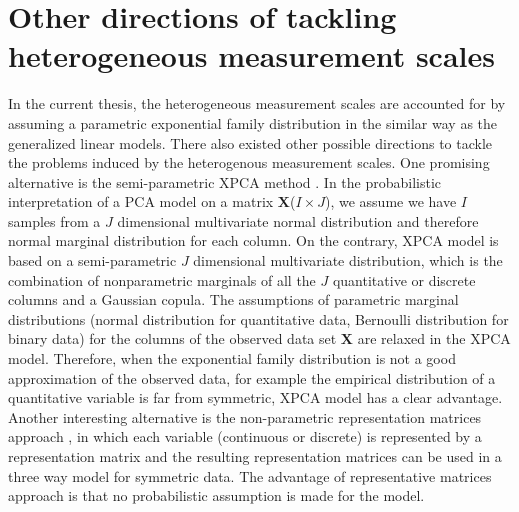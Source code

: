 \section{Other directions of tackling heterogeneous measurement scales}
In the current thesis, the heterogeneous measurement scales are accounted for by assuming a parametric exponential family distribution in the similar way as the generalized linear models. There also existed other possible directions \cite{kiers1989three, anderson2018xpca, de2009gifi} to tackle the problems induced by the heterogenous measurement scales. One promising alternative is the semi-parametric XPCA method \cite{anderson2018xpca}. In the probabilistic interpretation of a PCA model on a matrix $\mathbf{X}$($I\times J$), we assume we have $I$ samples from a $J$ dimensional multivariate normal distribution and therefore normal marginal distribution for each column. On the contrary, XPCA model is based on a semi-parametric $J$ dimensional multivariate distribution, which is the combination of nonparametric marginals of all the $J$ quantitative or discrete columns and a Gaussian copula. The assumptions of parametric marginal distributions (normal distribution for quantitative data, Bernoulli distribution for binary data) for the columns of the observed data set $\mathbf{X}$ are relaxed in the XPCA model. Therefore, when the exponential family distribution is not a good approximation of the observed data, for example the empirical distribution of a quantitative variable is far from symmetric, XPCA model has a clear advantage. Another interesting alternative is the non-parametric representation matrices approach \cite{kiers1989three}, in which each variable (continuous or discrete) is represented by a representation matrix and the resulting representation matrices can be used in a three way model for symmetric data. The advantage of representative matrices approach is that no probabilistic assumption is made for the model.

